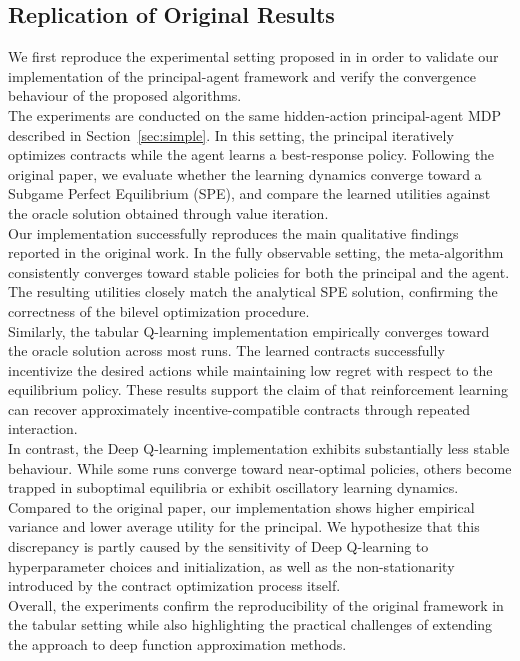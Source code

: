 \documentclass{article}
\theoremstyle{plain}
\theoremstyle{definition}
\theoremstyle{remark}
\begin{document}
\subsection{Replication of Original Results}
We first reproduce the experimental setting proposed in \citet{ivanov2024principal} in order to validate our implementation of the principal-agent framework and verify the convergence behaviour of the proposed algorithms.\\
The experiments are conducted on the same hidden-action principal-agent MDP described in Section~\ref{sec:simple}. In this setting, the principal iteratively optimizes contracts while the agent learns a best-response policy. Following the original paper, we evaluate whether the learning dynamics converge toward a Subgame Perfect Equilibrium (SPE), and compare the learned utilities against the oracle solution obtained through value iteration.\\
Our implementation successfully reproduces the main qualitative findings reported in the original work. In the fully observable setting, the meta-algorithm consistently converges toward stable policies for both the principal and the agent. The resulting utilities closely match the analytical SPE solution, confirming the correctness of the bilevel optimization procedure.\\
Similarly, the tabular Q-learning implementation empirically converges toward the oracle solution across most runs. The learned contracts successfully incentivize the desired actions while maintaining low regret with respect to the equilibrium policy. These results support the claim of \citet{ivanov2024principal} that reinforcement learning can recover approximately incentive-compatible contracts through repeated interaction.\\
In contrast, the Deep Q-learning implementation exhibits substantially less stable behaviour. While some runs converge toward near-optimal policies, others become trapped in suboptimal equilibria or exhibit oscillatory learning dynamics. Compared to the original paper, our implementation shows higher empirical variance and lower average utility for the principal. We hypothesize that this discrepancy is partly caused by the sensitivity of Deep Q-learning to hyperparameter choices and initialization, as well as the non-stationarity introduced by the contract optimization process itself.\\
Overall, the experiments confirm the reproducibility of the original framework in the tabular setting while also highlighting the practical challenges of extending the approach to deep function approximation methods.
\end{document}

